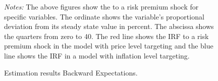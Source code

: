 \documentclass[11pt, a4paper, leqno]{article}
\begin{document}
\begin{figure}[ht!]
	\caption{Estimation results Backward Expectations.}
	\centering
    	\bigskip
	\begin{minipage}{\textwidth}%
		\footnotesize\setlength{\baselineskip}{11pt}%
		\bigskip \textit{Notes:} The above figures show the  to a risk premium shock for specific variables. The ordinate shows the variable's proportional deviation from its steady state value in percent. The abscissa shows the quarters from zero to 40. The red line shows the IRF to a risk premium shock in the model with price level targeting and the blue line shows the IRF in a model with inflation level targeting.
	\end{minipage}
\end{figure}
\end{document}
